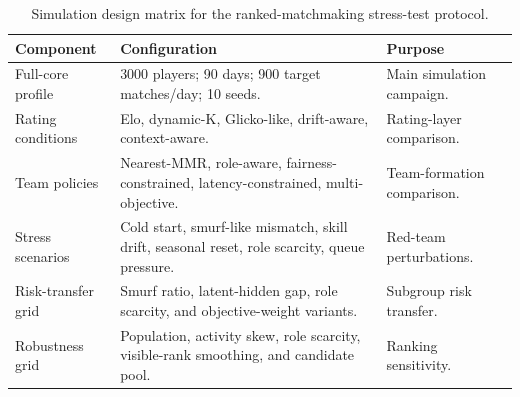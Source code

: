 \begin{table}[t]
\centering
\small
\caption{Simulation design matrix for the ranked-matchmaking stress-test protocol.}
\label{tab:design}
\setlength{\tabcolsep}{4pt}
\begin{tabularx}{\textwidth}{p{}X p{}}
\toprule
Component & Configuration & Purpose \\
\midrule
Full-core profile & 3000 players; 90 days; 900 target matches/day; 10 seeds. & Main simulation campaign. \\
Rating conditions & Elo, dynamic-K, Glicko-like, drift-aware, context-aware. & Rating-layer comparison. \\
Team policies & Nearest-MMR, role-aware, fairness-constrained, latency-constrained, multi-objective. & Team-formation comparison. \\
Stress scenarios & Cold start, smurf-like mismatch, skill drift, seasonal reset, role scarcity, queue pressure. & Red-team perturbations. \\
Risk-transfer grid & Smurf ratio, latent-hidden gap, role scarcity, and objective-weight variants. & Subgroup risk transfer. \\
Robustness grid & Population, activity skew, role scarcity, visible-rank smoothing, and candidate pool. & Ranking sensitivity. \\
\bottomrule
\end{tabularx}
\end{table}
